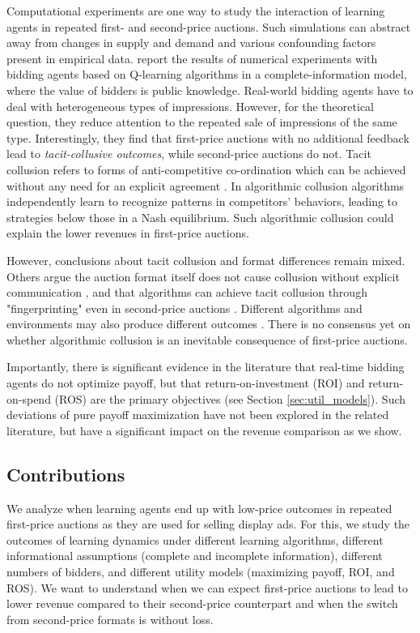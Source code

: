 \documentclass{article}
\begin{document}
Computational experiments are one way to study the interaction of learning agents in repeated first- and second-price auctions. Such simulations can abstract away from changes in supply and demand and various confounding factors present in empirical data. 
\citet{banchio2022artificial} report the results of numerical experiments with bidding agents based on Q-learning algorithms in a complete-information model, where the value of bidders is public knowledge. 
{Real-world bidding agents have to deal with heterogeneous types of impressions. However, for the theoretical question, they reduce attention to the repeated sale of impressions of the same type.} 
Interestingly, they find that first-price auctions with no additional feedback lead to \textit{tacit-collusive outcomes}, while second-price auctions do not. 
Tacit collusion refers to forms of anti-competitive co-ordination which can be achieved without any need for an explicit agreement \citep{OECD.2017}. 
In algorithmic collusion algorithms independently learn to recognize patterns in competitors' behaviors, leading to strategies below those in a Nash equilibrium.
Such algorithmic collusion could explain the lower revenues in first-price auctions.

However, conclusions about tacit collusion and format differences remain mixed. Others argue the auction format itself does not cause collusion without explicit communication \citep{deng2023we}, and that algorithms can achieve tacit collusion through "fingerprinting" even in second-price auctions \citep{Assad.2020}. Different algorithms and environments may also produce different outcomes \citep{brown2023competition}. There is no consensus yet on whether algorithmic collusion is an inevitable consequence of first-price auctions.

Importantly, there is significant evidence in the literature that real-time bidding agents do not optimize payoff, but that return-on-investment (ROI) and return-on-spend (ROS) are the primary objectives (see Section \ref{sec:util_models}). Such deviations of pure payoff maximization have not been explored in the related literature, but have a significant impact on the revenue comparison as we show. 


\subsection{Contributions}

We analyze when learning agents end up with low-price outcomes in repeated first-price auctions as they are used for selling display ads. For this, we study the outcomes of learning dynamics under different learning algorithms, different informational assumptions (complete and incomplete information), different numbers of bidders, and different utility models (maximizing payoff, ROI, and ROS). We want to understand when we can expect first-price auctions to lead to lower revenue compared to their second-price counterpart and when the switch from second-price formats is without loss.  
\end{document}
